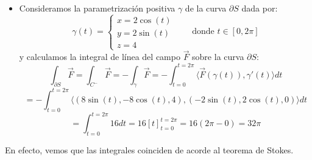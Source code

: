 {\begin{itemize}
        $$\int_{(S, \vec{n})} rot(\vec{F}) = -\int_{D} \langle \vec{N}_\varphi, rot(\vec{F}) \circ \varphi(x,y) \rangle dx dy = -\int_{D} \langle (-2x, -2y, 1), (x,y,-2(x^2+y^2) \rangle dx dy$$
        $$ = \int_{D} 2x^2 + 2y^2 + 2x^2 + 2y^2 dx dy = \int_{D} 4(x^2+y^2) dx dy = 4 \int_{\theta=0}^{\theta=2\pi} \int_{r=0}^{r=2} r^2 \cdot r \, dr \, d\theta$$ 
        $$= 4 \cdot 2\pi \left[ \frac{r^4}{4} \right]_{r=0}^{r=2} = 4 \cdot 2\pi \cdot 4 = 32\pi$$
        \item Consideramos la parametrización positiva $\gamma$ de la curva $\partial S$ dada por:
        $$ \gamma(t) = \begin{cases}
            x = 2 \cos(t) \\
            y = 2 \sin(t) \\
            z = 4
        \end{cases} \qquad \text{donde } t \in [0,2\pi]$$
        y calculamos la integral de línea del campo $\vec{F}$ sobre la curva $\partial S$:
        $$\int_{\partial S} \vec{F} = \int_{C^-} \vec{F} = -\int_{\gamma} \vec{F} = -\int_{t=0}^{t=2\pi} \langle \vec{F}(\gamma(t)), \gamma'(t) \rangle dt $$
        $$= -\int_{t=0}^{t=2\pi} \langle (8 \sin(t), -8 \cos(t), 4), (-2 \sin(t), 2 \cos(t), 0) \rangle dt$$
        $$= \int_{t=0}^{t=2\pi} 16 dt = 16 \left[ t \right]_{t=0}^{t=2\pi} = 16(2\pi - 0) = 32\pi$$
    \end{itemize}
    En efecto, vemos que las integrales coinciden de acorde al teorema de Stokes.
}

